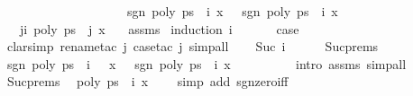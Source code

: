 \begin{isabellebody}
\ \ \ \ \ \ \ \ \ \ \ \ \ \ \ \ \ \ \ {\isasymLongrightarrow}\ sgn\ {\isacharparenleft}poly\ {\isacharparenleft}ps\ {\isacharbang}\ {\isacharparenleft}i{\isacharplus}{}{\isacharparenright}{\isacharparenright}\ x{\isacharparenright}\ {\isacharequal}\ {\isacharminus}\ sgn\ {\isacharparenleft}poly\ {\isacharparenleft}ps\ {\isacharbang}\ i{\isacharparenright}\ x{\isacharparenright}{\isachardoublequoteclose}\isanewline
\ \ \ {\isachardoublequoteopen}{\isasymforall}j{\isasymle}i{\isacharplus}{}{\isachardot}\ poly\ {\isacharparenleft}ps\ {\isacharbang}\ j{\isacharparenright}\ x\ {\isacharequal}\ {}{\isachardoublequoteclose}\isanewline
%
\isadelimproof
%
\endisadelimproof
%
\isatagproof
{}\isamarkupfalse%
\ assms\isanewline
{}\isamarkupfalse%
\ {\isacharparenleft}induction\ i{\isacharparenright}\isanewline
\ \ \isamarkupfalse%
\ {}\ \isamarkupfalse%
\ {\isacharquery}case\ \isamarkupfalse%
\ {\isacharparenleft}clarsimp{\isacharcomma}\ rename{\isacharunderscore}tac\ j{\isacharcomma}\ case{\isacharunderscore}tac\ j{\isacharcomma}\ simp{\isacharunderscore}all{\isacharparenright}\isanewline
{}\isamarkupfalse%
\isanewline
\ \ \isamarkupfalse%
\ {\isacharparenleft}Suc\ i{\isacharparenright}\isanewline
\ \ \ \ \isamarkupfalse%
\ Suc{\isachardot}prems{\isacharparenleft}{}{\isacharcomma}{}{\isacharparenright}\ \isanewline
\ \ \ \ \ \ \ \ \isamarkupfalse%
\ {\isachardoublequoteopen}sgn\ {\isacharparenleft}poly\ {\isacharparenleft}ps\ {\isacharbang}\ {\isacharparenleft}i\ {\isacharplus}\ {}{\isacharparenright}{\isacharparenright}\ x{\isacharparenright}\ {\isacharequal}\ {\isacharminus}\ sgn\ {\isacharparenleft}poly\ {\isacharparenleft}ps\ {\isacharbang}\ i{\isacharparenright}\ x{\isacharparenright}{\isachardoublequoteclose}\isanewline
\ \ \ \ \ \ \ \ \isamarkupfalse%
\ {\isacharparenleft}intro\ assms{\isacharparenleft}{}{\isacharparenright}{\isacharparenright}\ simp{\isacharunderscore}all\isanewline
\ \ \ \ \isamarkupfalse%
\ Suc{\isachardot}prems{\isacharparenleft}{}{\isacharparenright}\ \isamarkupfalse%
\ {\isachardoublequoteopen}poly\ {\isacharparenleft}ps\ {\isacharbang}\ i{\isacharparenright}\ x\ {\isacharequal}\ {}{\isachardoublequoteclose}\ \isamarkupfalse%
\ {\isacharparenleft}simp\ add{\isacharcolon}\ sgn{\isacharunderscore}zero{\isacharunderscore}iff{\isacharparenright}\isanewline

\end{isabellebody}
